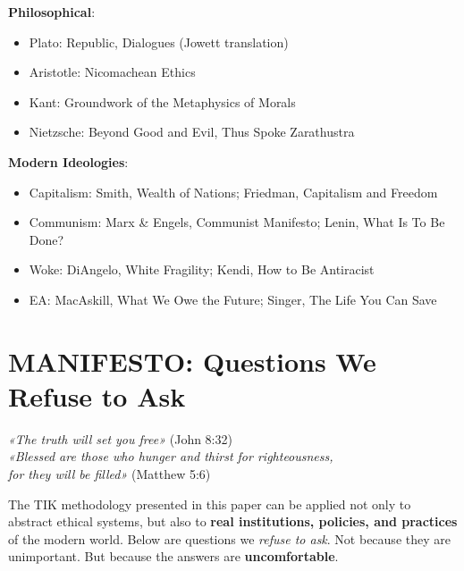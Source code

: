\documentclass[11pt,a4paper]{article}
\theoremstyle{definition}
\theoremstyle{remark}
\begin{document}
\textbf{Philosophical}:
\begin{itemize}
    \item Plato: Republic, Dialogues (Jowett translation)
    \item Aristotle: Nicomachean Ethics
    \item Kant: Groundwork of the Metaphysics of Morals
    \item Nietzsche: Beyond Good and Evil, Thus Spoke Zarathustra
\end{itemize}

\textbf{Modern Ideologies}:
\begin{itemize}
    \item Capitalism: Smith, Wealth of Nations; Friedman, Capitalism and Freedom
    \item Communism: Marx \& Engels, Communist Manifesto; Lenin, What Is To Be Done?
    \item Woke: DiAngelo, White Fragility; Kendi, How to Be Antiracist
    \item EA: MacAskill, What We Owe the Future; Singer, The Life You Can Save
\end{itemize}


\newpage
\section{MANIFESTO: Questions We Refuse to Ask}
\label{app:manifesto}

\begin{center}
\Large\textit{«The truth will set you free»} (John 8:32)\\[0.3em]
\large\textit{«Blessed are those who hunger and thirst for righteousness, \\for they will be filled»} (Matthew 5:6)
\end{center}

\vspace{1em}

\noindent The TIK methodology presented in this paper can be applied not only to abstract ethical systems, but also to \textbf{real institutions, policies, and practices} of the modern world. Below are questions we \textit{refuse to ask}. Not because they are unimportant. But because the answers are \textbf{uncomfortable}.
\end{document}
